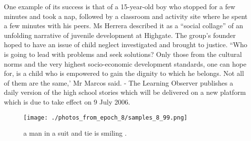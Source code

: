 \documentclass{article}%
\begin{document}
One example of its success is that of a 15{-}year{-}old boy who stopped for a few minutes and took a nap, followed by a classroom and activity site where he spent a few minutes with his peers.\newline%
Ms Herrera described it as a ``social collage'' of an unfolding narrative of juvenile development at Highgate.\newline%
The group's founder hoped to have an issue of child neglect investigated and brought to justice.\newline%
``Who is going to lead with problems and seek solutions? Only those from the cultural norms and the very highest socio{-}economic development standards, one can hope for, is a child who is empowered to gain the dignity to which he belongs. Not all of them are the same,' Mr Marcos said.\newline%
{-} The Learning Observer publishes a daily version of the high school stories which will be delivered on a new platform which is due to take effect on 9 July 2006.\newline%

%


\begin{figure}[h!]%
\centering%
\texttt{[image: ./photos\_from\_epoch\_8/samples\_8\_99.png]}%
\caption{a man in a suit and tie is smiling .}%
\end{figure}

%
\end{document}
